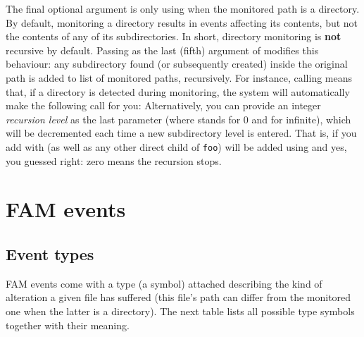 The final optional argument is only using when the monitored path is a
directory. By default, monitoring a directory results in events
affecting its contents, but not the contents of any of its
subdirectories. In short, directory monitoring is \textbf{not}
recursive by default. Passing  as the last (fifth) argument of
 modifies this behaviour: any subdirectory
found (or subsequently created) inside the original path is added to
list of monitored paths, recursively. For instance,
calling
means that, if a directory  is detected during
monitoring, the system will automatically make the following call for
you:
Alternatively, you can provide an integer \textit{recursion level} as
the last parameter (where  stands for 0 and  for
infinite), which will be decremented each time a new subdirectory
level is entered. That is, if you add  with
 (as well as any other direct child of
\texttt{foo}) will be added using
and yes, you guessed right: zero means the recursion stops.

\section{FAM events}
\label{sec:fam-events}

\subsection{Event types}
\label{sec:event-types}

FAM events come with a type (a symbol) attached describing the kind of
alteration a given file has suffered (this file's path can differ from
the monitored one when the latter is a directory). The next table
lists all possible type symbols together with their meaning.

